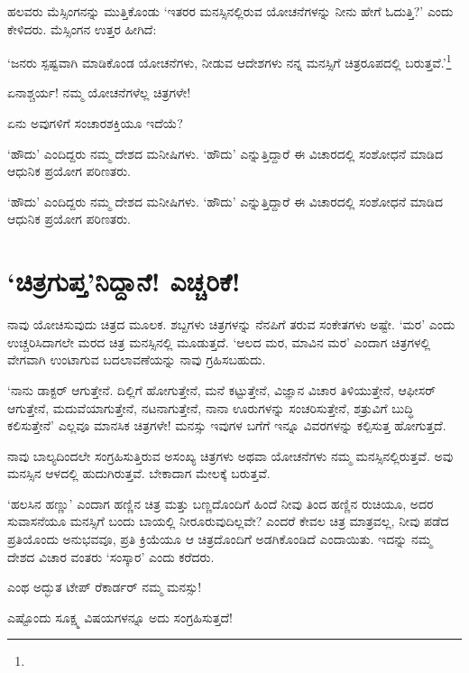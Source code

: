 ಹಲವರು ಮೆಸ್ಸಿಂಗನನ್ನು ಮುತ್ತಿಕೊಂಡು ‘ಇತರರ ಮನಸ್ಸಿನಲ್ಲಿರುವ ಯೋಚನೆಗಳನ್ನು ನೀನು ಹೇಗೆ ಓದುತ್ತಿ?’ ಎಂದು ಕೇಳಿದರು. ಮೆಸ್ಸಿಂಗನ ಉತ್ತರ ಹೀಗಿದೆ:

‘ಜನರು ಸ್ಪಷ್ಟವಾಗಿ ಮಾಡಿಕೊಂಡ ಯೋಚನೆಗಳು, ನೀಡುವ ಆದೇಶಗಳು ನನ್ನ ಮನಸ್ಸಿಗೆ ಚಿತ್ರರೂಪದಲ್ಲಿ ಬರುತ್ತವೆ.’\footnote{\hfill{}}

ಏನಾಶ್ಚರ್ಯ! ನಮ್ಮ ಯೋಚನೆಗಳೆಲ್ಲ ಚಿತ್ರಗಳೇ!

ಏನು ಅವುಗಳಿಗೆ ಸಂಚಾರಶಕ್ತಿಯೂ ಇದೆಯೆ?

‘ಹೌದು’ ಎಂದಿದ್ದರು ನಮ್ಮ ದೇಶದ ಮನೀಷಿಗಳು. ‘ಹೌದು’ ಎನ್ನುತ್ತಿದ್ದಾರೆ ಈ ವಿಚಾರದಲ್ಲಿ ಸಂಶೋಧನೆ ಮಾಡಿದ ಆಧುನಿಕ ಪ್ರಯೋಗ ಪರಿಣತರು.

‘ಹೌದು’ ಎಂದಿದ್ದರು ನಮ್ಮ ದೇಶದ ಮನೀಷಿಗಳು. ‘ಹೌದು’ ಎನ್ನುತ್ತಿದ್ದಾರೆ ಈ ವಿಚಾರದಲ್ಲಿ ಸಂಶೋಧನೆ ಮಾಡಿದ ಆಧುನಿಕ ಪ್ರಯೋಗ ಪರಿಣತರು.


\section*{‘ಚಿತ್ರಗುಪ್ತ’ನಿದ್ದಾನೆ! ಎಚ್ಚರಿಕೆ!}


ನಾವು ಯೋಚಿಸುವುದು ಚಿತ್ರದ ಮೂಲಕ. ಶಬ್ದಗಳು ಚಿತ್ರಗಳನ್ನು ನೆನಪಿಗೆ ತರುವ ಸಂಕೇತಗಳು ಅಷ್ಟೇ. ‘ಮರ’ ಎಂದು ಉಚ್ಚರಿಸಿದಾಗಲೇ ಮರದ ಚಿತ್ರ ಮನಸ್ಸಿನಲ್ಲಿ ಮೂಡುತ್ತದೆ. ‘ಆಲದ ಮರ, ಮಾವಿನ ಮರ’ ಎಂದಾಗ ಚಿತ್ರಗಳಲ್ಲಿ ವೇಗವಾಗಿ ಉಂಟಾಗುವ ಬದಲಾವಣೆಯನ್ನು ನಾವು ಗ್ರಹಿಸಬಹುದು.

‘ನಾನು ಡಾಕ್ಟರ್ ಆಗುತ್ತೇನೆ. ದಿಲ್ಲಿಗೆ ಹೋಗುತ್ತೇನೆ, ಮನೆ ಕಟ್ಟುತ್ತೇನೆ, ವಿಜ್ಞಾನ ವಿಚಾರ ತಿಳಿಯುತ್ತೇನೆ, ಆಫೀಸರ್​ ಆಗುತ್ತೇನೆ, ಮದುವೆಯಾಗುತ್ತೇನೆ, ನಟನಾಗುತ್ತೇನೆ, ನಾನಾ ಊರುಗಳನ್ನು ಸಂಚರಿಸುತ್ತೇನೆ, ಶತ್ರುವಿಗೆ ಬುದ್ಧಿ ಕಲಿಸುತ್ತೇನೆ’ ಎಲ್ಲವೂ ಮಾನಸಿಕ ಚಿತ್ರಗಳೇ! ಮನಸ್ಸು ಇವುಗಳ ಬಗೆಗೆ ಇನ್ನೂ ವಿವರಗಳನ್ನು ಕಲ್ಪಿಸುತ್ತ ಹೋಗುತ್ತದೆ.

ನಾವು ಬಾಲ್ಯದಿಂದಲೇ ಸಂಗ್ರಹಿಸುತ್ತಿರುವ ಅಸಂಖ್ಯ ಚಿತ್ರಗಳು ಅಥವಾ ಯೋಚನೆಗಳು ನಮ್ಮ ಮನಸ್ಸಿನಲ್ಲಿರುತ್ತವೆ. ಅವು ಮನಸ್ಸಿನ ಆಳದಲ್ಲಿ ಹುದುಗಿರುತ್ತವೆ. ಬೇಕಾದಾಗ ಮೇಲಕ್ಕೆ ಬರುತ್ತವೆ.

‘ಹಲಸಿನ ಹಣ್ಣು’ ಎಂದಾಗ ಹಣ್ಣಿನ ಚಿತ್ರ ಮತ್ತು ಬಣ್ಣದೊಂದಿಗೆ ಹಿಂದೆ ನೀವು ತಿಂದ ಹಣ್ಣಿನ ರುಚಿಯೂ, ಅದರ ಸುವಾಸನೆಯೂ ಮನಸ್ಸಿಗೆ ಬಂದು ಬಾಯಲ್ಲಿ ನೀರೂರುವುದಿಲ್ಲವೇ? ಎಂದರೆ ಕೇವಲ ಚಿತ್ರ ಮಾತ್ರವಲ್ಲ, ನೀವು ಪಡೆದ ಪ್ರತಿಯೊಂದು ಅನುಭವವೂ, ಪ್ರತಿ ಕ್ರಿಯೆಯೂ ಆ ಚಿತ್ರದೊಂದಿಗೆ ಅಡಗಿಕೊಂಡಿದೆ ಎಂದಾಯಿತು. ಇದನ್ನು ನಮ್ಮ ದೇಶದ ವಿಚಾರ ವಂತರು ‘ಸಂಸ್ಕಾರ’ ಎಂದು ಕರೆದರು.

ಎಂಥ ಅದ್ಭುತ ಟೇಪ್ ರೆಕಾರ್ಡರ್ ನಮ್ಮ ಮನಸ್ಸು!

ಎಷ್ಟೊಂದು ಸೂಕ್ಷ್ಮ ವಿಷಯಗಳನ್ನೂ ಅದು ಸಂಗ್ರಹಿಸುತ್ತದೆ!

